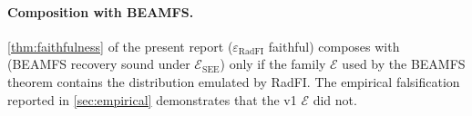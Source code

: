 \paragraph{Composition with BEAMFS.}
\cref{thm:faithfulness} of the present report
(\(\varepsilon_{\text{RadFI}}\) faithful) composes
with~\cite[Theorem~IV.1]{desbrieres2026beamfsv1} (BEAMFS recovery
sound under \(\mathcal{E}_{\text{SEE}}\)) only if the family
\(\mathcal{E}\) used by the BEAMFS theorem contains the distribution
emulated by RadFI. The empirical falsification reported in
\cref{sec:empirical} demonstrates that the v1 \(\mathcal{E}\) did
not.
